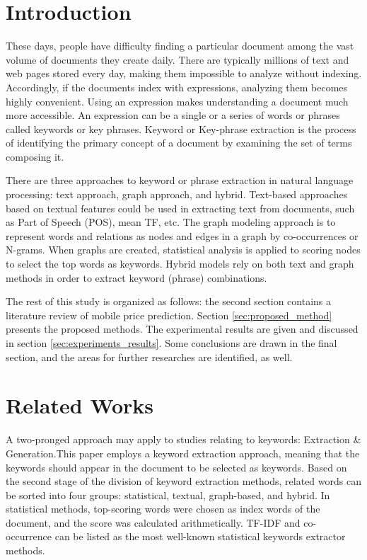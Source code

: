 \documentclass[3p]{elsarticle}
\begin{document}
\section{Introduction} \label{sec:Introduction}
These days, people have difficulty finding a particular document among the vast volume of documents they create daily. There are typically millions of text and web pages stored every day, making them impossible to analyze without indexing. Accordingly, if the documents index with expressions, analyzing them becomes highly convenient. Using an expression makes understanding a document much more accessible. An expression can be a single or a series of words or phrases called keywords or key phrases. Keyword or Key-phrase extraction is the process of identifying the primary concept of a document by examining the set of terms composing it\cite{berry_kogan_2010}.

There are three approaches to keyword or phrase extraction in natural language processing: text approach, graph approach, and hybrid. Text-based approaches based on textual features could be used in extracting text from documents, such as Part of Speech (POS), mean TF, etc. The graph modeling approach is to represent words and relations as nodes and edges in a graph by co-occurrences or N-grams. When graphs are created, statistical analysis is applied to scoring nodes to select the top words as keywords. Hybrid models rely on both text and graph methods in order to extract keyword (phrase) combinations.



The rest of this study is organized as follows: the second section contains a literature review of mobile price prediction. Section \ref{sec:proposed_method} presents the proposed methods. The experimental results are given and discussed in section \ref{sec:experiments_results}. Some conclusions are drawn in the final section, and the areas for further researches are identified, as well.
\section{Related Works} \label{sec:related_works}
A two-pronged approach may apply to studies relating to keywords: Extraction \& Generation.This paper employs a keyword extraction approach, meaning that the keywords should appear in the document to be selected as keywords. Based on the second stage of the division of keyword extraction methods, related words can be sorted into four groups: statistical, textual, graph-based, and hybrid. In statistical methods, top-scoring words were chosen as index words of the document, and the score was calculated arithmetically. TF-IDF\cite{Lott2012} and co-occurrence\cite{matsuo2004keyword} can be listed as the most well-known statistical keywords extractor methods.
\end{document}
